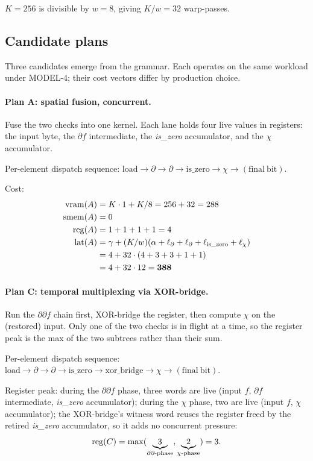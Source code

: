 $K = 256$ is divisible by $w = 8$, giving
$K/w = 32$ warp-passes.

\subsection{Candidate plans}\label{app-e:plans}

Three candidates emerge from the grammar. Each
operates on the same workload under MODEL-4; their
cost vectors differ by production choice.

\paragraph{Plan A: spatial fusion, concurrent.}
Fuse the two checks into one kernel. Each lane
holds four live values in registers: the input byte,
the $\partial f$ intermediate, the \emph{is\_zero}
accumulator, and the $\chi$ accumulator.

Per-element dispatch sequence:
$\mathrm{load} \to \partial \to \partial \to
\mathrm{is\_zero} \to \chi \to (\mathrm{final\ bit})$.

Cost:
\begin{align*}
  \operatorname{vram}(A) &= K \cdot 1 + K/8 = 256 + 32 = 288 \\
  \operatorname{smem}(A) &= 0 \\
  \operatorname{reg}(A)  &= 1 + 1 + 1 + 1 = 4 \\
  \operatorname{lat}(A)  &= \gamma + (K/w)(\alpha + \ell_\partial +
              \ell_\partial + \ell_{\text{is\_zero}} + \ell_\chi) \\
           &= 4 + 32 \cdot (4 + 3 + 3 + 1 + 1) \\
           &= 4 + 32 \cdot 12 = \mathbf{388}
\end{align*}

\paragraph{Plan C: temporal multiplexing via XOR-bridge.}
Run the $\partial \partial f$ chain first, XOR-bridge
the register, then compute $\chi$ on the (restored)
input. Only one of the two checks is in flight at a
time, so the register peak is the max of the two
subtrees rather than their sum.

Per-element dispatch sequence:
$\mathrm{load} \to \partial \to \partial \to
\mathrm{is\_zero} \to \mathrm{xor\_bridge} \to \chi
\to (\mathrm{final\ bit})$.

Register peak: during the $\partial\partial f$ phase,
three words are live (input $f$, $\partial f$
intermediate, \emph{is\_zero} accumulator); during the
$\chi$ phase, two are live (input $f$, $\chi$
accumulator); the XOR-bridge's witness word reuses the
register freed by the retired \emph{is\_zero}
accumulator, so it adds no concurrent pressure:
\begin{equation*}
  \operatorname{reg}(C) = \max(\underbrace{3}_{\partial\partial\text{-phase}},
                 \underbrace{2}_{\chi\text{-phase}}) = 3.
\end{equation*}

